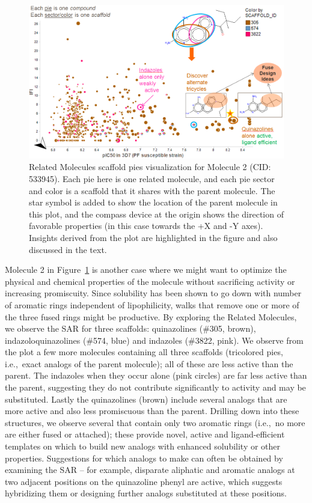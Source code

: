 \documentclass[journal=jacsat,manuscript=article]{achemso}
\newcommand*\fref[1]{Figure~\ref{fig:#1}}
\newcommand*\ie{i.e.,~}
\begin{document}
\begin{figure}
\includegraphics[width=6in]{fig/mol2_RGtool_scafpie2.png}
\caption{Related Molecules scaffold pies visualization for Molecule 2 (CID: 533945). Each pie here is one related molecule, and each pie sector and color is a scaffold that it shares with the parent molecule. The star symbol is added to show the location of the parent molecule in this plot, and the compass device at the origin shows the direction of favorable properties (in this case towards the +X and -Y axes). Insights derived from the plot are highlighted in the figure and also discussed in the text.}
\label{fig:scafwalk2}
\end{figure}

Molecule 2 in \fref{scafwalk2} is another case where we might want to optimize the physical and chemical properties of the molecule without sacrificing activity or increasing promiscuity. Since solubility has been shown to go down with number of aromatic rings independent of lipophilicity\cite{Hill2010}, walks that remove one or more of the three fused rings might be productive. By exploring the Related Molecules, we observe the SAR for three scaffolds: quinazolines (\#305, brown), indazoloquinazolines (\#574, blue) and indazoles (\#3822, pink). We observe from the plot a few more molecules containing all three scaffolds (tricolored pies, \ie exact analogs of the parent molecule); all of these are less active than the parent. The indazoles when they occur alone (pink circles) are far less active than the parent, suggesting they do not contribute significantly to activity and may be substituted. Lastly the quinazolines (brown) include several analogs that are more active and also less promiscuous than the parent. Drilling down into these structures, we observe several that contain only two aromatic rings (\ie no more are either fused or attached); these provide novel, active and ligand-efficient templates on which to build new analogs with enhanced solubility or other properties. Suggestions for which analogs to make can often be obtained by examining the SAR -- for example, disparate aliphatic and aromatic analogs at two adjacent positions on the quinazoline phenyl are active, which suggests hybridizing them or designing further analogs substituted at these positions.
\end{document}
